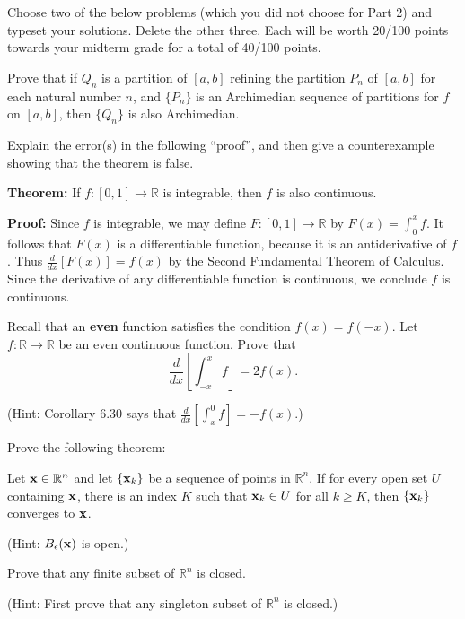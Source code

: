 \documentclass[letterpaper, twoside, 12pt]{book}
\begin{document}
Choose two of the below problems (which you did not choose for
Part 2) and typeset your solutions. Delete the other three.
Each will be worth 20/100 points towards your midterm grade
for a total of 40/100 points.


\begin{exercise}[1]
Prove that if \(Q_n\) is a partition of \([a,b]\) refining
the partition \(P_n\) of \([a,b]\) for each
natural number \(n\), and \(\{P_n\}\) is an Archimedian sequence of
partitions for \(f\) on \([a,b]\), then \(\{Q_n\}\) is also Archimedian.
\end{exercise}
\begin{solution}

\end{solution}

\begin{exercise}[2]
Explain the error(s) in the following ``proof'',
and then give a counterexample showing that the theorem is false.

\textbf{Theorem:} If \(f:[0,1]\to\mathbb R\) is integrable, then
\(f\) is also continuous.

\textbf{Proof:}
Since \(f\) is integrable, we may define \(F:[0,1]\to\mathbb R\)
by \(F(x)=\int_0^x f\). It follows
that \(F(x)\) is a differentiable function, because it is an antiderivative
of \(f\). Thus \(\frac{d}{dx}[F(x)]=f(x)\) by the Second Fundamental
Theorem of Calculus. Since the derivative of any differentiable function
is continuous, we conclude \(f\) is continuous.
\end{exercise}
\begin{solution}

\end{solution}

\begin{exercise}[3]
Recall that an \textbf{even} function satisfies the condition \(f(x)=f(-x)\).
Let \(f:\mathbb R\to\mathbb R\) be an even continuous function.
Prove that
\[
  \frac{d}{dx}\left[\int_{-x}^x f\right]=2f(x)
.\]

(Hint: Corollary 6.30 says that \(\frac{d}{dx}[\int_{x}^0f]=-f(x)\).)
\end{exercise}
\begin{solution}

\end{solution}

\begin{exercise}[4]
Prove the following theorem:

Let \(\mathbf x\in\mathbb R^n\) and let \(\{\mathbf x_k\}\) be a sequence
of points in \(\mathbb R^n\). If for every open set \(U\)
containing \(\mathbf x\), there is an index \(K\) such that
\(\mathbf x_k\in U\) for all \(k\geq K\),
then \(\{\mathbf x_k\}\) converges to \(\mathbf x\).

(Hint: \(B_\epsilon(\mathbf x)\) is open.)
\end{exercise}
\begin{solution}

\end{solution}

\begin{exercise}[5]
Prove that any finite subset of \(\mathbb R^n\) is closed.

(Hint: First
prove that any singleton subset of \(\mathbb R^n\) is closed.)
\end{exercise}
\begin{solution}

\end{solution}
\end{document}
